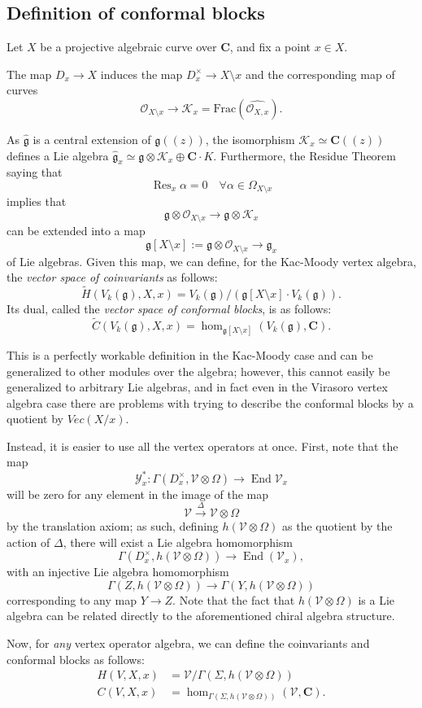 \documentclass{article}
\newcommand{\CC}{\mathbold{C}}
\newcommand{\Oo}{\mathcal{O}}
\newcommand{\Kk}{\mathcal{K}}
\newcommand{\Vv}{\mathcal{V}}
\newcommand{\Yy}{\mathcal{Y}}
\newcommand{\gf}{\mathfrak{g}}
\newcommand{\ghat}{\widehat{\mathfrak{g}}}
\DeclareMathOperator{\Res}{Res}
\DeclareMathOperator{\End}{End}
\begin{document}
\subsection{Definition of conformal blocks}
Let $X$ be a projective algebraic curve over $\CC$, and fix a point $x \in X$.

The map $D_x \rightarrow X$ induces the map $D^\times_x \rightarrow X \setminus x$ and the corresponding map of curves
\[\Oo_{X \setminus x} \rightarrow \Kk_x = \textrm{Frac}(\widehat{\Oo_{X,x}}). \]

As $\ghat$ is a central extension of $\gf((z))$, the isomorphism $\Kk_x \simeq \CC((z))$ defines a Lie algebra $\ghat_x \simeq \gf \otimes \Kk_x \oplus \CC \cdot K$.  Furthermore, the Residue Theorem saying that
\[\Res_x\alpha=0 \quad \forall \alpha \in \Omega_{X \setminus x} \]
implies that
\[\gf \otimes \Oo_{X \setminus x} \rightarrow \gf \otimes \Kk_x \]
can be extended into a map
\[\gf[X \setminus x]:=\gf \otimes \Oo_{X \setminus x} \rightarrow \gf_x \]
of Lie algebras.  Given this map, we can define, for the Kac-Moody vertex algebra, the \textit{vector space of coinvariants} as follows:
\[\widetilde{H}(V_k(\gf),X,x)=V_k(\gf) / (\gf[X \setminus x] \cdot V_k(\gf)). \]
Its dual, called the \textit{vector space of conformal blocks}, is as follows:
\[\widetilde{C}(V_k(\gf),X,x)=\hom_{\gf[X \setminus x]}(V_k(\gf),\CC). \]

This is a perfectly workable definition in the Kac-Moody case and can be generalized to other modules over the algebra; however, this cannot easily be generalized to arbitrary Lie algebras, and in fact even in the Virasoro vertex algebra case there are problems with trying to describe the conformal blocks by a quotient by $Vec(X/x)$.

Instead, it is easier to use all the vertex operators at once.  First, note that the map
\[\Yy_x^*: \Gamma(D_x^\times,\Vv \otimes \Omega) \rightarrow \End \Vv_x \]
will be zero for any element in the image of the map
\[\Vv \overset{\Delta}{\rightarrow} \Vv \otimes \Omega \]
by the translation axiom; as such, defining $h(\Vv \otimes \Omega)$ as the quotient by the action of $\Delta$, there will exist a Lie algebra homomorphism
\[\Gamma(D_x^\times,h(\Vv \otimes \Omega)) \rightarrow \End(\Vv_x), \]
with an injective Lie algebra homomorphism
\[\Gamma(Z,h(\Vv \otimes \Omega)) \rightarrow \Gamma(Y,h(\Vv \otimes \Omega)) \]
corresponding to any map $Y \rightarrow Z$.  Note that the fact that $h(\Vv \otimes \Omega)$ is a Lie algebra can be related directly to the aforementioned chiral algebra structure.

Now, for \textit{any} vertex operator algebra, we can define the coinvariants and conformal blocks as follows:
\begin{align}
  H(V,X,x)&=\Vv / \Gamma(\Sigma,h(\Vv \otimes \Omega))\\
  C(V,X,x)&=\hom_{\Gamma(\Sigma,h(\Vv \otimes \Omega))}(\Vv,\CC).
\end{align}
\end{document}
